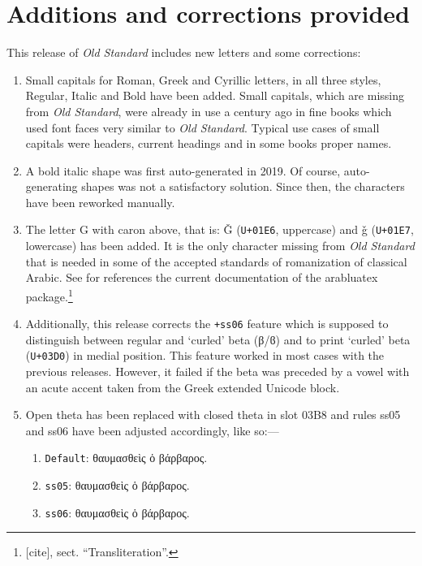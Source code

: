 \section{Additions and corrections provided}
\label{sec:addit-corr-prov}
This release of \emph{Old Standard} includes new letters and some
corrections:
\begin{enumerate}
\item Small capitals for Roman, Greek and Cyrillic letters, in all
  three styles, Regular, Italic and Bold have been added. Small
  capitals, which are missing from \emph{Old Standard}, were already
  in use a century ago in fine books which used font faces very
  similar to \emph{Old Standard}. Typical use cases of small capitals
  were headers, current headings and in some books proper names.
\item A bold italic shape was first auto-generated in 2019. Of course,
  auto-generating shapes was not a satisfactory solution. Since then,
  the characters have been reworked manually.
\item The letter G with caron above, that is: Ǧ (\verb|U+01E6|,
  uppercase) and ǧ (\verb|U+01E7|, lowercase) has been added. It is
  the only character missing from \emph{Old Standard} that is needed
  in some of the accepted standards of romanization of classical
  Arabic. See for references the current documentation of the
  \textsf{arabluatex} package.\footnote{[cite], sect{.}
    \enquote{Transliteration}.}
\item Additionally, this release corrects the \verb|+ss06| feature
  which is supposed to distinguish between regular and
  \enquote*{curled} beta (β/ϐ) and to print \enquote*{curled} beta
  (\verb|U+03D0|) in medial position. This feature worked in most
  cases with the previous releases. However, it failed if the beta was
  preceded by a vowel with an acute accent taken from the Greek
  extended Unicode block.
\item Open theta has been replaced with closed theta in slot 03B8 and
  rules ss05 and ss06 have been adjusted accordingly, like so:---
  \begin{enumerate}
  \item \texttt{Default}: {%
      θαυμασθεὶς ὁ βάρβαρος.}
  \item \texttt{ss05}: {%
      θαυμασθεὶς ὁ βάρβαρος.}
  \item \texttt{ss06}: {%
      θαυμασθεὶς ὁ βάρβαρος.}

\end{enumerate}
\end{enumerate}
